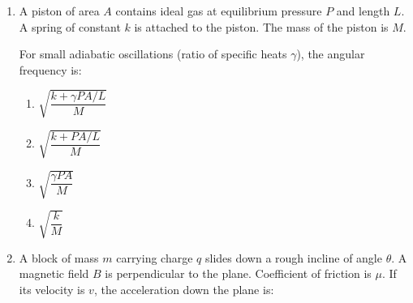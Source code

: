 \documentclass[12pt]{article}
\begin{document}
\begin{enumerate}[leftmargin=0pt,itemindent=0pt]

\item A piston of area $A$ contains ideal gas at equilibrium pressure $P$ and length $L$. A spring of constant $k$ is attached to the piston. The mass of the piston is $M$.

For small adiabatic oscillations (ratio of specific heats $\gamma$), the angular frequency is:

\begin{center}
\end{center}

\begin{enumerate}
\item[(A)] $\sqrt{\dfrac{k+\gamma PA/L}{M}}$
\item[(B)] $\sqrt{\dfrac{k+PA/L}{M}}$
\item[(C)] $\sqrt{\dfrac{\gamma PA}{M}}$
\item[(D)] $\sqrt{\dfrac{k}{M}}$
\end{enumerate}


\item A block of mass $m$ carrying charge $q$ slides down a rough incline of angle $\theta$. A magnetic field $B$ is perpendicular to the plane. Coefficient of friction is $\mu$. If its velocity is $v$, the acceleration down the plane is:

\begin{center}
\end{center}


\end{enumerate}
\end{document}

